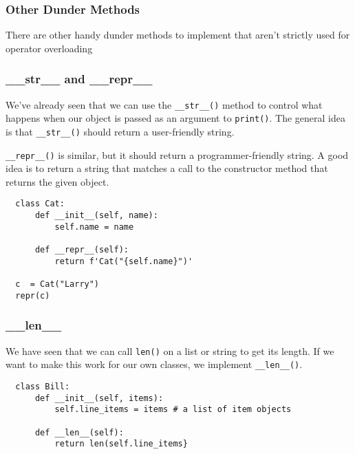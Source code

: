 \documentclass[10pt]{beamer}
\begin{document}
\begin{frame}
  \frametitle{Other Dunder Methods}
  
  There are other handy dunder methods to implement that aren't strictly 
  used for operator overloading 
  
\end{frame}

\begin{frame}[fragile]
  \frametitle{\_\_str\_\_  and \_\_repr\_\_}
  
  We've already seen that we can use the \texttt{\_\_str\_\_()}
  method to control what happens when our object is passed as an argument to 
  \texttt{print()}. The general idea is that \texttt{\_\_str\_\_()} should return 
  a user-friendly string.
  
  \vspace{5mm}
  \texttt{\_\_repr\_\_()} is similar, but it should return a programmer-friendly string. A
  good idea is to return a string that matches a call to the constructor method that returns
  the given object.
  
  \begin{verbatim}
  class Cat:
      def __init__(self, name):
          self.name = name
          
      def __repr__(self):
          return f'Cat("{self.name}")'
          
  c  = Cat("Larry")
  repr(c)                 
  \end{verbatim}           
  
\end{frame}

\begin{frame}[fragile]
  \frametitle{\_\_len\_\_}
  
  We have seen that we can call \texttt{len()} on a list or
  string to get its length. If we want to make this work for our own classes,
  we implement \texttt{\_\_len\_\_()}.

  \begin{verbatim}
  class Bill:
      def __init__(self, items):
          self.line_items = items # a list of item objects
          
      def __len__(self):
          return len(self.line_items}
  \end{verbatim}        

\end{frame}
\end{document}

